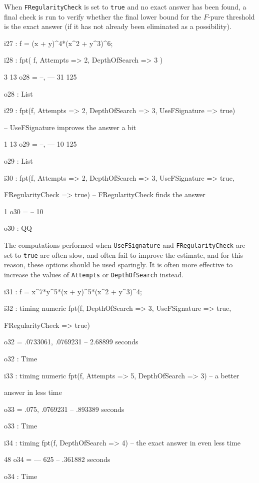 \documentclass{amsart}
\begin{document}
When {\tt FRegularityCheck} is set to {\tt true} and no exact answer has been found, a final check is run to verify whether the final lower bound for the $F$-pure threshold is the exact answer (if it has not already been eliminated as a possibility).

{\small
{}
\begin{MyVerbatim}

i27 : f = (x + y)^4*(x^2 + y^3)^6;

i28 : fpt( f, Attempts => 2, DepthOfSearch => 3 )

        3   13
o28 = {--, ---}
       31  125

o28 : List

i29 : fpt(f, Attempts => 2, DepthOfSearch => 3, UseFSignature => true)

      -- UseFSignature improves the answer a bit

        1   13
o29 = {--, ---}
       10  125

o29 : List

i30 : fpt(f, Attempts => 2, DepthOfSearch => 3, UseFSignature => true,

      FRegularityCheck => true) -- FRegularityCheck finds the answer

       1
o30 = --
      10

o30 : QQ
\end{MyVerbatim}
}
\medspace

The computations performed when {\tt UseFSignature} and {\tt FRegularityCheck} are set to {\tt true} are often slow, and often fail to improve the estimate, and for this reason, these options should be used sparingly.
            It is often more effective to increase the values of {\tt Attempts} or {\tt DepthOfSearch} instead.

{\small
{}
\begin{MyVerbatim}

i31 : f = x^7*y^5*(x + y)^5*(x^2 + y^3)^4;

i32 : timing numeric fpt(f, DepthOfSearch => 3, UseFSignature => true,

      FRegularityCheck => true)

o32 = {.0733061, .0769231}
      -- 2.68899 seconds

o32 : Time

i33 : timing numeric fpt(f, Attempts => 5, DepthOfSearch => 3) -- a better

      answer in less time

o33 = {.075, .0769231}
      -- .893389 seconds

o33 : Time

i34 : timing fpt(f, DepthOfSearch => 4) -- the exact answer in even less
      time

       48
o34 = ---
      625
      -- .361882 seconds

o34 : Time
\end{MyVerbatim}
}
\medspace
\end{document}
